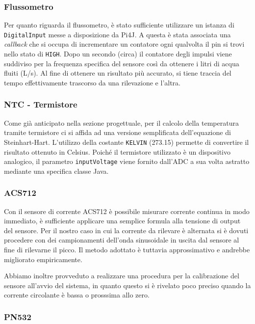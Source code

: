 \subsubsection{Flussometro}
Per quanto riguarda il flussometro, è stato sufficiente utilizzare un istanza di \texttt{DigitalInput} messe a disposizione da Pi4J. A questa è stata associata una \textit{callback} che si occupa di incrementare un contatore ogni qualvolta il pin si trovi nello stato di \texttt{HIGH}. Dopo un secondo (circa) il contatore degli impulsi viene suddiviso per la frequenza specifica del sensore così da ottenere i litri di acqua fluiti (L/s). Al fine di ottenere un risultato più accurato, si tiene traccia del tempo effettivamente trascorso da una rilevazione e l'altra.

%
\subsubsection{NTC - Termistore}
Come già anticipato nella sezione progettuale, per il calcolo della temperatura tramite termistore ci si affida ad una versione semplificata dell'equazione di Steinhart-Hart. L'utilizzo della costante \texttt{KELVIN} (273.15) permette di convertire il risultato ottenuto in Celsius. Poiché il termistore utilizzato è un dispositivo analogico, il parametro \texttt{inputVoltage} viene fornito dall'ADC a sua volta astratto mediante una specifica classe Java.

% 
\subsubsection{ACS712}
Con il sensore di corrente ACS712 è possibile misurare corrente continua in modo immediato, è sufficiente applicare una semplice formula alla tensione di output del sensore.
Per il nostro caso in cui la corrente da rilevare è alternata si è dovuti procedere con dei campionamenti dell'onda sinusoidale in uscita dal sensore al fine di rilevarne il picco.
Il metodo adottato è tuttavia approssimativo e andrebbe migliorato empiricamente.

Abbiamo inoltre provveduto a realizzare una procedura per la calibrazione del sensore all'avvio del sistema, in quanto questo si è rivelato poco preciso quando la corrente circolante è bassa o prosssima allo zero.
%
\subsubsection{PN532}

